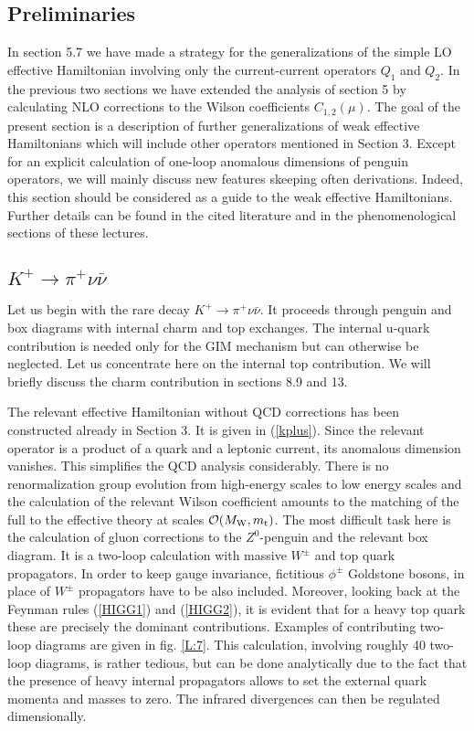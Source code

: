 \documentclass[12pt]{article}
\newcommand{\mt}{m_{\rm t}}
\newcommand{\mw}{M_{\rm W}}
\newcommand{\ord}{{\cal O}}
\def\kpnn{$K^+\rightarrow\pi^+\nu\bar\nu$}
\begin{document}
\begin{itemize}
\begin{itemize}
\subsection{Preliminaries}
In section 5.7 we have made a strategy for the generalizations of the
simple LO effective Hamiltonian involving only the current-current
operators $Q_1$ and $Q_2$. In the previous two sections we have extended
the analysis of section 5 by calculating NLO corrections to the
Wilson coefficients $C_{1,2}(\mu)$. The goal of the present section
is a description of further generalizations of weak effective
Hamiltonians which will include other operators mentioned
in Section 3. 
Except for an explicit calculation of one-loop anomalous
dimensions of penguin operators,
we will mainly discuss new features skeeping often
derivations. Indeed, this section should be considered as a guide
to the weak effective Hamiltonians. Further details can be found in
the cited literature and in the phenomenological sections of these
lectures.
\subsection{\kpnn}
Let us begin with the rare decay \kpnn. It proceeds through penguin
and box diagrams with internal charm and top exchanges. The internal
u-quark contribution is needed only for the GIM mechanism but can  
otherwise be neglected. Let us concentrate here on the internal top
contribution. We will briefly discuss the charm contribution in
sections 8.9 and 13.

The relevant effective Hamiltonian without QCD corrections has been
constructed already in Section 3. It is given in (\ref{kplus}).
Since the relevant operator is a product of a quark and a leptonic
current, its anomalous dimension vanishes. This simplifies the
QCD analysis considerably. There is no renormalization group
evolution from high-energy scales to low energy scales and the
calculation of the relevant Wilson coefficient amounts to the
matching of the full to the effective theory at scales $\ord(\mw,\mt)$.
The most difficult task here is the calculation of gluon corrections
to the $Z^0$-penguin and the relevant box diagram. It is a two-loop
calculation with massive $W^\pm$ and top quark propagators. In
order to keep gauge invariance, fictitious $\phi^\pm$ Goldstone
bosons, in place of $W^\pm$ propagators have to be also included.
Moreover, looking back at the Feynman rules (\ref{HIGG1}) and
(\ref{HIGG2}), it is evident that for a heavy top quark these are
precisely the dominant contributions. 
Examples of contributing two-loop diagrams are given in fig. \ref{L:7}.
This calculation, involving
roughly 40 two-loop diagrams, is rather tedious, but can be done
analytically due to the fact that the presence of heavy internal
propagators allows to set the external quark momenta
and masses to zero. The infrared divergences can then be regulated
dimensionally. 


\end{itemize}
\end{itemize}
\end{document}
